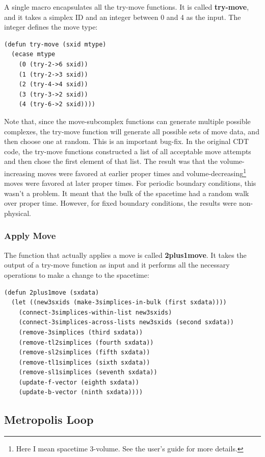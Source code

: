 \documentclass[12pt]{article}
\begin{document}
A single macro encapsulates all the try-move functions. It is called
\textbf{try-move}, and it takes a simplex ID and an integer between 0
and 4 as the input. The integer defines the move type:
\begin{lstlisting}
(defun try-move (sxid mtype)
  (ecase mtype
    (0 (try-2->6 sxid))
    (1 (try-2->3 sxid))
    (2 (try-4->4 sxid))
    (3 (try-3->2 sxid))
    (4 (try-6->2 sxid))))
\end{lstlisting}

Note that, since the move-subcomplex functions can generate multiple
possible complexes, the try-move function will generate all possible
sets of move data, and then choose one at random. This is an important
bug-fix. In the original CDT code, the try-move functions constructed
a list of all acceptable move attempts and then chose the first
element of that list. The result was that the volume-increasing moves
were favored at earlier proper times and
volume-decreasing\footnote{Here I mean spacetime 3-volume. See the
  user's guide for more details.} moves were favored at later proper
times. For periodic boundary conditions, this wasn't a problem. It
meant that the bulk of the spacetime had a random walk over proper
time. However, for fixed boundary conditions, the results were
non-physical.

\subsubsection{Apply Move}

The function that actually applies a move is called
\textbf{2plus1move}. It takes the output of a try-move function as
input and it performs all the necessary operations to make a change to
the spacetime:
\begin{lstlisting}
(defun 2plus1move (sxdata)
  (let ((new3sxids (make-3simplices-in-bulk (first sxdata))))
    (connect-3simplices-within-list new3sxids)
    (connect-3simplices-across-lists new3sxids (second sxdata))
    (remove-3simplices (third sxdata))
    (remove-tl2simplices (fourth sxdata))
    (remove-sl2simplices (fifth sxdata))
    (remove-tl1simplices (sixth sxdata))
    (remove-sl1simplices (seventh sxdata))
    (update-f-vector (eighth sxdata))
    (update-b-vector (ninth sxdata))))
\end{lstlisting}

\subsection{Metropolis Loop}
\label{s:f:metropolis:loop}
\end{document}
